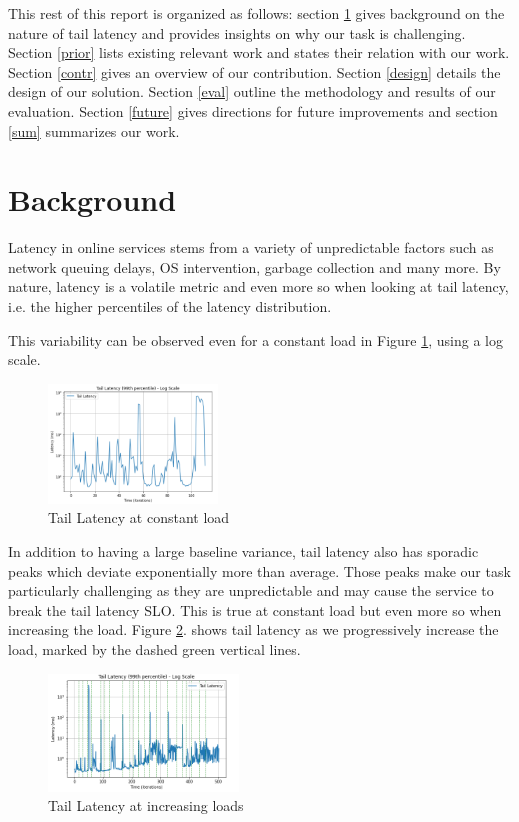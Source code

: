 \documentclass[10pt,conference,compsocconf]{IEEEtran}
\begin{document}
This rest of this report is organized as follows: section \ref{background} gives background on the nature of tail latency and provides insights on why our task is challenging. Section \ref{prior} lists existing relevant work and states their relation with our work. Section \ref{contr} gives an overview of our contribution. Section \ref{design} details the design of our solution. Section \ref{eval} outline the methodology and results of our evaluation. Section \ref{future} gives directions for future improvements and section \ref{sum} summarizes our work.

\section{Background} \label{background}

Latency in online services stems from a variety of unpredictable factors such as network queuing delays, OS intervention, garbage collection and many more. By nature, latency is a volatile metric and even more so when looking at tail latency, i.e. the higher percentiles of the latency distribution.

This variability can be observed even for a constant load in Figure \ref{fig:lat1}, using a log scale.
\begin{figure}[H]
	\centering
	\includegraphics[width=0.4\textwidth]{lat.png}
	\caption{Tail Latency at constant load}
	\label{fig:lat1}
\end{figure}

In addition to having a large baseline variance, tail latency also has sporadic peaks which deviate exponentially more than average. Those peaks make our task particularly challenging as they are unpredictable and may cause the service to break the tail latency SLO. This is true at constant load but even more so when increasing the load. Figure \ref{fig:lat2}. shows tail latency as we progressively increase the load, marked by the dashed green vertical lines.

\begin{figure}[H]
	\centering
	\includegraphics[width=0.45\textwidth]{lat2.png}
	\caption{Tail Latency at increasing loads}
	\label{fig:lat2}
\end{figure}
\end{document}
